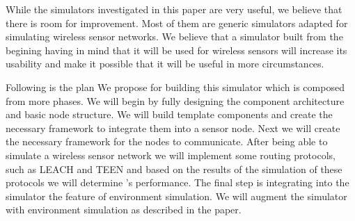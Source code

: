 
While the simulators investigated in this paper are very useful, we believe
that there is room for improvement. Most of them are generic simulators
adapted for simulating wireless sensor networks. We believe that a simulator
built from the begining having in mind that it will be used for wireless
sensors will increase its usability and make it possible that it will be
useful in more circumstances.

Following is the plan We propose for building this simulator which is 
composed from more phases. We
will begin by fully designing the component architecture and basic node
structure. We will build template components and create the necessary framework to integrate them 
into a sensor node. Next we will create the necessary framework for the nodes
to communicate. 
After being able to simulate a wireless sensor network we will implement some
routing protocols, such as LEACH and TEEN and based on the results of the
simulation of these protocols we will determine \codename's performance.
The final step is integrating into the simulator the feature of environment
simulation. We will augment the simulator with environment simulation as described in the paper.
